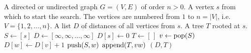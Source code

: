 
\begin{algorithmic}[1]
\Require A directed or undirected graph $G = (V, E)$ of order $n > 0$. A
  vertex $s$ from which to start the search. The vertices are numbered
  from $1$ to  $n = |V|$, i.e.~$V = \{1, 2, \dots, n\}$.
\Ensure A list $D$ of distances of all vertices from $s$. A tree $T$
  rooted at $s$.
\State $S \gets [s]$
\State $D \gets [\infty, \infty, \dots, \infty]$
\State $D[s] \gets 0$
\State $T \gets [\,]$
  \State $v \gets \operatorname*{pop}(S)$
      \State $D[w] \gets D[v] + 1$
      \State $\operatorname*{push}(S, w)$
      \State $\operatorname*{append}(T, vw)$
    \EndIf
  \EndFor
\EndWhile
\State \Return $(D, T)$
\end{algorithmic}

